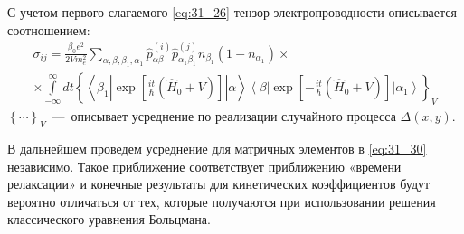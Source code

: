 С учетом первого слагаемого \eqref{eq:31_26} тензор
электропроводности описывается соотношением:
\begin{multline}\label{eq:31_30}
\displaystyle\sigma_{ij}=\frac{\beta_0 e^2}{2Vm_e^2}
\sum\limits_{\alpha,\beta ,\beta_1 ,\alpha_1 } \hat {p}_{\alpha \beta}^{(i)} \hat{p}_{\alpha_1 \beta_1}^{(j)}
n_{\beta_1} \left( 1 - n_{\alpha_1}\right)\times\\
\times\int\limits_{- \infty }^\infty {dt \left\{ \left\langle\beta_1 \left| \exp\left[\frac{it}{\hbar}\left(\hat{H}_0 + V\right)\right]	\right|\alpha\right\rangle \right.} \displaystyle\left.\left\langle \beta\right|\exp\left[-\frac{it}{\hbar}\left(\hat{H}_0 + V\right)\right] \left|\alpha_1\right\rangle\right\}_V
\end{multline}
${\left\{\cdots \right\}}_V$~---~описывает усреднение по реализации случайного процесса $\Delta \left(x,y\right)$.

В дальнейшем проведем усреднение для матричных элементов в \eqref{eq:31_30} независимо. Такое приближение соответствует приближению «времени релаксации» \cite{Khamidullin2002} и конечные результаты для кинетических коэффициентов будут вероятно отличаться от тех, которые получаются при использовании решения классического уравнения Больцмана. 

